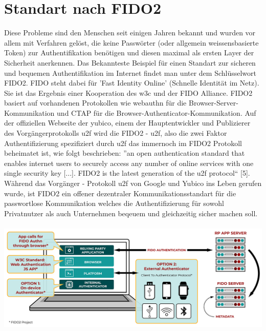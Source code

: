 \section{Standart nach FIDO2}
Diese Probleme sind den Menschen seit einigen Jahren bekannt und wurden vor allem mit Verfahren gelöst, die keine Passwörter (oder allgemein weissensbasierte Token) zur Authentifikation benötigen und diesen maximal als ersten Layer der Sicherheit anerkennen. Das Bekannteste Beispiel für einen Standart zur sicheren und bequemen Authentifikation im Internet findet man unter dem Schlüsselwort FIDO2. FIDO steht dabei für 'Fast Identity Online' (Schnelle Identität im Netz). Sie ist das Ergebnis einer Kooperation des \ac{w3c} und der FIDO Alliance. FIDO2 basiert auf vorhandenen Protokollen wie \ac{webauthn} für die Browser-Server-Kommunikation und CTAP für die Browser-Authenticator-Kommunikation. Auf der offiziellen Webseite der yubico, einem der Hauptentwickler und Publizierer des Vorgängerprotokolls \ac{u2f} wird die FIDO2 - \ac{u2f}, also die zwei Faktor Authentifizierung spezifiziert durch \ac{u2f} das immernoch im FIDO2 Protokoll beheimatet ist, wie folgt beschrieben: ''an open authentication standard that enables internet users to securely access any number of online services with one single security key [...]. FIDO2 is the latest generation of the \ac{u2f} protocol`` [5]. Während das Vorgänger - Protokoll \ac{u2f} von Google und Yubico ins Leben gerufen wurde, ist FIDO2 ein offener dezentraler Kommunikationsstandart für die passwortlose Kommunikation welches die Authentifizierung für sowohl Privatnutzer als auch Unternehmen beqeuem und gleichzeitig sicher machen soll. \\ \\
\includegraphics[width=15cm]{Graphics/FIDO2-Graphic-v2.png} \\
\\
